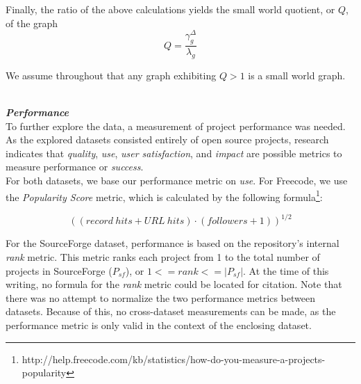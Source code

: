 \documentclass{proc}
\begin{document}
Finally, the ratio of the above calculations yields the small world quotient, or $Q$, of the graph
\[Q = \frac{\gamma^{\Delta}_g }{\lambda_g} \]

We assume throughout that any graph exhibiting {$Q > 1$} is a small world graph.

\noindent\\\textit{\textbf{Performance}}\\
To further explore the data, a measurement of project performance was needed. As the explored datasets consisted entirely of open source projects, research indicates that \textit{quality}, \textit{use}, \textit{user satisfaction}, and \textit{impact} are possible metrics to measure performance or \textit{success}\cite{crowston2003defining}.\\

For both datasets, we base our performance metric on \textit{use}. For Freecode, we use the \textit{Popularity Score} metric, which is calculated by the following formula\footnote{http://help.freecode.com/kb/statistics/how-do-you-measure-a-projects-popularity}:

\[ ((record\ hits + URL\ hits) \cdot (followers + 1))^{1/2} \]

For the SourceForge dataset, performance is based on the repository's internal \textit{rank} metric. This metric ranks each project from 1 to the total number of projects in SourceForge ($P_{sf}$), or ${1 <= rank <= |P_{sf}|}$. At the time of this writing, no formula for the \textit{rank} metric could be located for citation.  Note that there was no attempt to normalize the two performance metrics between datasets. Because of this, no cross-dataset measurements can be made, as the performance metric is only valid in the context of the enclosing dataset. 
\end{document}
